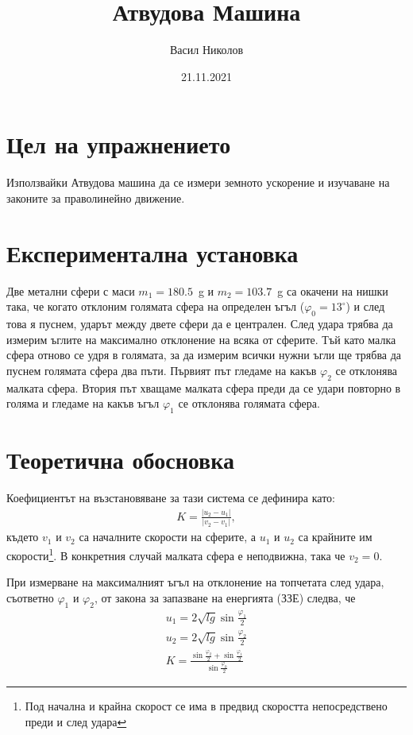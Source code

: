 \documentclass[aps, prb, twocolumn, a4paper, floatfix, reprint]{revtex4-2}
\newcommand{\degree}{^{\circ}}
\newcommand{\abs}[1]{\lvert#1\rvert}
\let\phi\varphi
\begin{document}
\title{Атвудова Машина}
\author{Васил Николов}
\noaffiliation
\date{21.11.2021}
\maketitle

\section{Цел на упражнението}
Използвайки Атвудова машина да се измери земното ускорение и изучаване на законите за праволинейно движение. 

\section{Експериментална установка}
Две метални сфери с маси $m_1 = 180.5$~g и $m_2=103.7$~g са окачени на нишки така, че когато отклоним голямата сфера на определен ъгъл ($\phi_0 = 13\degree$) и след това я пуснем, ударът между двете сфери да е централен. След удара трябва да измерим ъглите на максимално отклонение на всяка от сферите. Тъй като малка сфера отново се удря в голямата, за да измерим всички нужни ъгли ще трябва да пуснем голямата сфера два пъти. Първият път гледаме на какъв $\phi_{2}$ се отклонява малката сфера. Втория път хващаме малката сфера преди да се удари повторно в голяма и гледаме на какъв ъгъл $\phi_{1}$ се отклонява голямата сфера.


\section{Теоретична обосновка}
Коефициентът на възстановяване за тази система се дефинира като:
\begin{gather*}
    K=\frac{\abs{u_2 - u_1}}{\abs{v_2 - v_1}},
\end{gather*}
където $v_1$ и $v_2$ са началните скорости на сферите, а $u_1$ и $u_2$ са крайните им скорости\footnote{Под начална и крайна скорост се има в предвид скоростта непосредствено преди и след удара}. В конкретния случай малката сфера е неподвижна, така че $v_{2} = 0$.

При измерване на максималният ъгъл на отклонение на топчетата след удара, съответно $\phi_1$ и $\phi_2$, от закона за запазване на енергията (ЗЗЕ) следва, че
\begin{gather}
    u_1 = 2\sqrt{lg}\sin\frac{\phi_1}{2} \nonumber\\
    u_2 = 2\sqrt{lg}\sin\frac{\phi_2}{2} \nonumber\\
    K   = \frac{\sin\frac{\phi_2}{2} + \sin\frac{\phi_1}{2}}{\sin\frac{\phi_0}{2}} \label{eq:1}
\end{gather}
\end{document}
